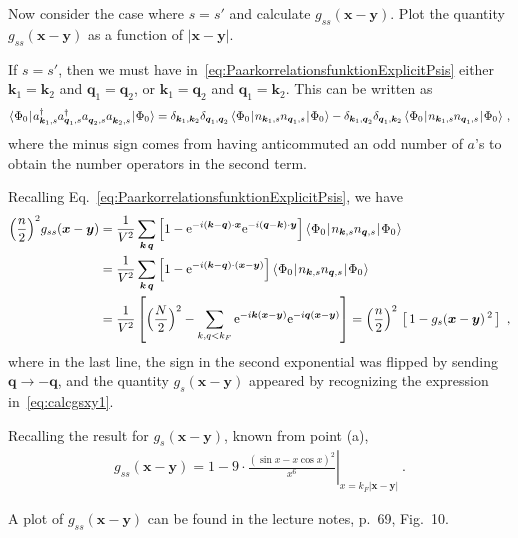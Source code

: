 \documentclass[11pt,a4paper]{article}
\newcommand{\ee}{{\mathrm{e}}}
\newcommand{\abs}[1]{\lvert#1\rvert}
\newcommand{\matrixel}[3]{\langle\hspace{0.15mm}#1\hspace{0.25mm}\vert\hspace{0.25mm} #2
  \hspace{0.25mm}\vert\hspace{0.25mm}#3\hspace{0.15mm}\rangle}
\newcommand{\boldx}{{\boldsymbol x}}
\newcommand{\boldy}{{\boldsymbol y}}
\newcommand{\boldk}{{\boldsymbol k}}
\newcommand{\boldq}{{\boldsymbol q}}
\newcommand{\nodagger}{{\vphantom{\dagger}}} %
\begin{document}
\begin{exenumerate}
\item Now consider the case where $s=s'$ and calculate $g_{ss}(\boldx-\boldy)$. Plot the quantity
  $g_{ss}(\boldx-\boldy)$ as a function of $\abs{\boldx-\boldy}$.

  \begin{loesung}
    If $s=s'$, then we must have in~\eqref{eq:PaarkorrelationsfunktionExplicitPsis} either $\boldk_1=\boldk_2$
    and $\boldq_1=\boldq_2$, or $\boldk_1=\boldq_2$ and $\boldq_1=\boldk_2$. This can be written as
    \begin{align}
      \matrixel{\Phi_0}{a^\dagger_{\boldk_1,s}a^\dagger_{\boldq_1,s}
        a^\nodagger_{\boldq_2,s}a^\nodagger_{\boldk_2,s}}{\Phi_0}
      = \delta_{\boldk_1,\boldk_2}\delta_{\boldq_1,\boldq_2}\,
      \matrixel{\Phi_0}{n_{\boldk_1,s} n_{\boldq_1,s}}{\Phi_0}
      - \delta_{\boldk_1,\boldq_2}\delta_{\boldq_1,\boldk_2}\,
      \matrixel{\Phi_0}{n_{\boldk_1,s} n_{\boldq_1,s}}{\Phi_0}\ ,
    \end{align}
    where the minus sign comes from having anticommuted an odd number of $a$'s to obtain the number operators in
    the second term.

    Recalling Eq.~\eqref{eq:PaarkorrelationsfunktionExplicitPsis}, we have
    \begin{align}
      \Bigl(\frac{n}{2}\Bigr)^2 g_{ss}(\boldx-\boldy)
      &= \frac{1}{V^2} \sum_{\boldk\,\boldq}
      \left[1 - \ee^{-i\left(\boldk-\boldq\right)\cdot\boldx}\ee^{-i\left(\boldq-\boldk\right)\cdot\boldy}\right]
      \matrixel{\Phi_0}{n_{\boldk,s}n_{\boldq,s}}{\Phi_0} \nonumber\\
      &= \frac{1}{V^2} \sum_{\boldk\,\boldq}
      \left[1 - \ee^{-i\left(\boldk-\boldq\right)\cdot\left(\boldx-\boldy\right)}\right]
      \matrixel{\Phi_0}{n_{\boldk,s}n_{\boldq,s}}{\Phi_0} \nonumber\\
      &= \frac{1}{V^2} \left[ \Bigl(\frac{N}{2}\Bigr)^2
        - \sum_{k,q<k_F} \ee^{-i\boldk\left(\boldx-\boldy\right)}\ee^{-i\boldq\left(\boldx-\boldy\right)} \right]
      = \Bigl(\frac{n}{2}\Bigr)^2\,\left[\,1 - g_s(\boldx-\boldy)\,^2\,\right]\ ,
    \end{align}
    where in the last line, the sign in the second exponential was flipped by sending $\boldq\rightarrow-\boldq$,
    and the quantity $g_s(\boldx-\boldy)$ appeared by recognizing the expression in~\eqref{eq:calcgsxy1}.

    Recalling the result for $g_s(\boldx-\boldy)$, known from point (a),
    \begin{align}
      g_{ss}(\boldx-\boldy)
      = 1 - 9\cdot\left.\frac{\left(\sin x - x\cos x\right)^2}{x^6}\right\rvert_{x=k_F\abs{\boldx-\boldy}}\ .
    \end{align}

    A plot of $g_{ss}(\boldx-\boldy)$ can be found in the lecture notes, p.~69, Fig.~10.
  \end{loesung}
\end{exenumerate}
\end{document}
